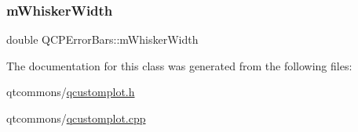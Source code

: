 \mbox{\label{class_q_c_p_error_bars_a3873724f7ac3392bdf9d46a47076a1d2}} 
\subsubsection{\texorpdfstring{mWhiskerWidth}{mWhiskerWidth}}
{\footnotesize\ttfamily double Q\+C\+P\+Error\+Bars\+::m\+Whisker\+Width\hspace{0.3cm}{\ttfamily [protected]}}



The documentation for this class was generated from the following files\+:\begin{DoxyCompactItemize}
\item 
qtcommons/\mbox{\hyperlink{qcustomplot_8h}{qcustomplot.\+h}}\item 
qtcommons/\mbox{\hyperlink{qcustomplot_8cpp}{qcustomplot.\+cpp}}\end{DoxyCompactItemize}
